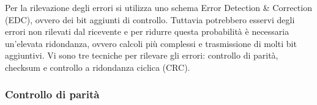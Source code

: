 \documentclass{subfiles}
\begin{document}
    Per la rilevazione degli errori si utilizza uno schema Error Detection \& Correction (EDC), ovvero dei bit aggiunti di controllo. 
    Tuttavia potrebbero esservi degli errori non rilevati dal ricevente e per ridurre questa probabilità è necessaria un'elevata 
    ridondanza, ovvero calcoli più complessi e trasmissione di molti bit aggiuntivi. Vi sono tre tecniche per rilevare gli errori: 
    controllo di parità, checksum e controllo a ridondanza ciclica (CRC). 

\subsubsection{Controllo di parità}
    
\end{document}

